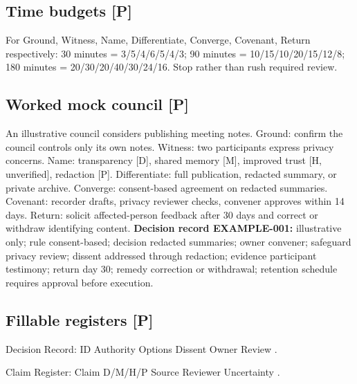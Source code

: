 \documentclass[12pt]{article}
\begin{document}
\subsection{Time budgets [P]}
For Ground, Witness, Name, Differentiate, Converge, Covenant, Return respectively: 30 minutes = 3/5/4/6/5/4/3; 90 minutes = 10/15/10/20/15/12/8; 180 minutes = 20/30/20/40/30/24/16. Stop rather than rush required review.
\subsection{Worked mock council [P]}
An illustrative council considers publishing meeting notes. Ground: confirm the council controls only its own notes. Witness: two participants express privacy concerns. Name: transparency [D], shared memory [M], improved trust [H, unverified], redaction [P]. Differentiate: full publication, redacted summary, or private archive. Converge: consent-based agreement on redacted summaries. Covenant: recorder drafts, privacy reviewer checks, convener approves within 14 days. Return: solicit affected-person feedback after 30 days and correct or withdraw identifying content.
\textbf{Decision record EXAMPLE-001:} illustrative only; rule consent-based; decision redacted summaries; owner convener; safeguard privacy review; dissent addressed through redaction; evidence participant testimony; return day 30; remedy correction or withdrawal; retention schedule requires approval before execution.
\subsection{Fillable registers [P]}
Decision Record: ID \underline{\hspace{1cm}} Authority \underline{\hspace{2cm}} Options \underline{\hspace{2cm}} Dissent \underline{\hspace{2cm}} Owner \underline{\hspace{2cm}} Review \underline{\hspace{2cm}}.

Claim Register: Claim \underline{\hspace{2cm}} D/M/H/P \underline{\hspace{1cm}} Source \underline{\hspace{2cm}} Reviewer \underline{\hspace{2cm}} Uncertainty \underline{\hspace{2cm}}.
\end{document}
